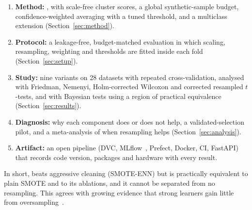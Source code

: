 \begin{enumerate}
  \item \textbf{Method:} \ars{}, with scale-free cluster scores, a global synthetic-sample budget, confidence-weighted
        averaging with a tuned threshold, and a multiclass extension (Section~\ref{sec:method}).
  \item \textbf{Protocol:} a leakage-free, budget-matched evaluation in which scaling, resampling, weighting and
        thresholds are fitted inside each fold (Section~\ref{sec:setup}).
  \item \textbf{Study:} nine variants on 28 datasets with repeated cross-validation, analysed with Friedman, Nemenyi,
        Holm-corrected Wilcoxon and corrected resampled $t$-tests, and with Bayesian tests using a region of
        practical equivalence~\cite{benavoli2017time} (Section~\ref{sec:results}).
  \item \textbf{Diagnosis:} why each component does or does not help, a validated-selection pilot, and a meta-analysis
        of when resampling helps (Section~\ref{sec:analysis}).
  \item \textbf{Artifact:} an open pipeline (DVC, MLflow~\cite{zaharia2018accelerating}, Prefect, Docker, CI,
        FastAPI) that records code version, packages and hardware with every result.
\end{enumerate}

In short, \ars{} beats aggressive cleaning (SMOTE-ENN) but is practically equivalent to plain SMOTE and to its
ablations, and it cannot be separated from no resampling. This agrees with growing evidence that strong learners
gain little from oversampling~\cite{elor2022smote,vandengoorbergh2022harm,vanhulse2007experimental}.
